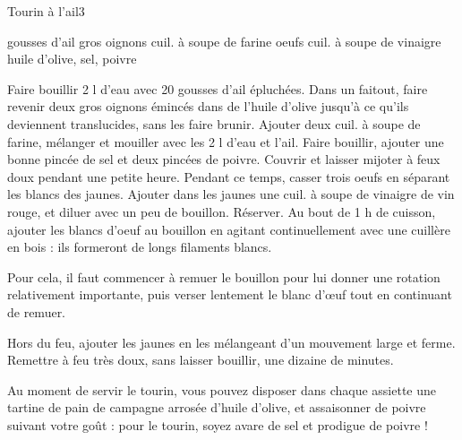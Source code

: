 \begin{recette}{Tourin à l'ail}{3}{}{}
\begin{ingredients}
 gousses d'ail
 gros oignons
 cuil. à soupe de farine
 oeufs
 cuil. à soupe de vinaigre
\ingredient huile d'olive, sel, poivre
\end{ingredients}

\begin{preparation}
\etape Faire bouillir 2 l d'eau avec 20 gousses d'ail épluchées.
\etape Dans un faitout, faire revenir deux gros oignons émincés dans de l'huile d'olive jusqu'à ce qu'ils deviennent translucides, sans les faire brunir.
\etape Ajouter deux cuil. à soupe de farine, mélanger et mouiller avec les 2 l d'eau et l'ail.
\etape Faire bouillir, ajouter une bonne pincée de sel et deux pincées de poivre.
\etape Couvrir et laisser mijoter à feux doux pendant une petite heure.
\etape Pendant ce temps, casser trois oeufs en séparant les blancs des jaunes.
\etape Ajouter dans les jaunes une cuil. à soupe de vinaigre de vin rouge, et diluer avec un peu de bouillon. Réserver.
\etape Au bout de 1 h de cuisson, ajouter les blancs d'oeuf au bouillon en agitant continuellement avec une cuillère en bois : ils formeront de longs filaments blancs.
\begin{remarque}
Pour cela, il faut commencer à remuer le bouillon pour lui donner une rotation relativement importante, puis verser lentement le blanc d'œuf tout en continuant de remuer.
\end{remarque}
\etape Hors du feu, ajouter les jaunes en les mélangeant d'un mouvement large et ferme.
\etape Remettre à feu très doux, sans laisser bouillir, une dizaine de minutes.
\end{preparation}

\begin{remarque}
Au moment de servir le tourin, vous pouvez disposer dans chaque assiette une tartine de pain de campagne arrosée d'huile d'olive, et assaisonner de poivre suivant votre goût : pour le tourin, soyez avare de sel et prodigue de poivre !
\end{remarque}
\end{recette}

